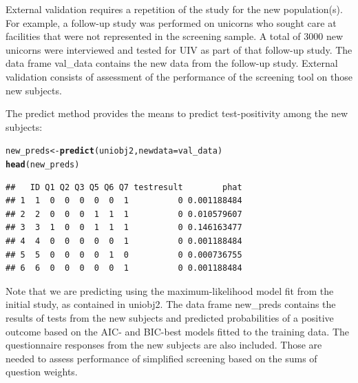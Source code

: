 \documentclass[11pt]{report}\usepackage[]{graphicx}\usepackage[]{xcolor}
\makeatletter
\newcommand{\hlstd}[1]{\textcolor[rgb]{0.345,0.345,0.345}{#1}}%
\newcommand{\hlkwb}[1]{\textcolor[rgb]{0.69,0.353,0.396}{#1}}%
\newcommand{\hlkwc}[1]{\textcolor[rgb]{0.333,0.667,0.333}{#1}}%
\newcommand{\hlkwd}[1]{\textcolor[rgb]{0.737,0.353,0.396}{\textbf{#1}}}%
\newenvironment{kframe}{%
 \def\at@end@of@kframe{}%
 \ifinner\ifhmode%
  \def\at@end@of@kframe{\end{minipage}}%
  \begin{minipage}{\columnwidth}%
 \fi\fi%
 \def\FrameCommand##1{\hskip\@totalleftmargin \hskip-\fboxsep
 \colorbox{shadecolor}{##1}\hskip-\fboxsep
     \hskip-\linewidth \hskip-\@totalleftmargin \hskip\columnwidth}%
 \MakeFramed {\advance\hsize-\width
   \@totalleftmargin\z@ \linewidth\hsize
   \@setminipage}}%
 {\par\unskip\endMakeFramed%
 \at@end@of@kframe}
\newenvironment{knitrout}{}{} %
\makeatother
\begin{document}
External validation requires a repetition of the study for the new
population(s). For example, a follow-up study was performed on
unicorns who sought care at facilities that were not represented in
the screening sample. A total of 3000 new unicorns
were interviewed and tested for UIV as part of that follow-up
study. The data frame \textsf{val\_data} contains the new data from
the follow-up study. External validation consists of assessment of the
performance of the screening tool on those new subjects.

The \textsf{predict} method provides the means to predict test-positivity among
the new subjects:

\begin{knitrout}
\color{fgcolor}\begin{kframe}
\begin{alltt}
\hlstd{new_preds} \hlkwb{<-} \hlkwd{predict}\hlstd{(uniobj2,} \hlkwc{newdata} \hlstd{= val_data)}
\hlkwd{head}\hlstd{(new_preds)}
\end{alltt}
\begin{verbatim}
##   ID Q1 Q2 Q3 Q5 Q6 Q7 testresult        phat
## 1  1  0  0  0  0  0  1          0 0.001188484
## 2  2  0  0  0  1  1  1          0 0.010579607
## 3  3  1  0  0  1  1  1          0 0.146163477
## 4  4  0  0  0  0  0  1          0 0.001188484
## 5  5  0  0  0  0  1  0          0 0.000736755
## 6  6  0  0  0  0  0  1          0 0.001188484
\end{verbatim}
\end{kframe}
\end{knitrout}
Note that we are predicting using the maximum-likelihood model fit
from the initial study, as contained in \textsf{uniobj2}. The data
frame \textsf{new\_preds} contains the results of tests from the new
subjects and predicted probabilities of a positive outcome based on
the AIC- and BIC-best models fitted to the training data. The
questionnaire responses from the new subjects are also included. Those
are needed to assess performance of simplified screening based on the
sums of question weights.
\end{document}
